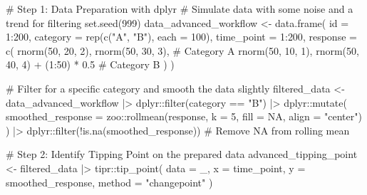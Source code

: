 \documentclass[
  10pt,
  letterpaper,
  DIV=11,
  numbers=noendperiod]{scrartcl}
\newenvironment{Shaded}{\begin{snugshade}}{\end{snugshade}}
\newcommand{\AttributeTok}[1]{\textcolor[rgb]{0.40,0.45,0.13}{#1}}
\newcommand{\CommentTok}[1]{\textcolor[rgb]{0.37,0.37,0.37}{#1}}
\newcommand{\ConstantTok}[1]{\textcolor[rgb]{0.56,0.35,0.01}{#1}}
\newcommand{\DecValTok}[1]{\textcolor[rgb]{0.68,0.00,0.00}{#1}}
\newcommand{\FloatTok}[1]{\textcolor[rgb]{0.68,0.00,0.00}{#1}}
\newcommand{\FunctionTok}[1]{\textcolor[rgb]{0.28,0.35,0.67}{#1}}
\newcommand{\NormalTok}[1]{\textcolor[rgb]{0.00,0.23,0.31}{#1}}
\newcommand{\OtherTok}[1]{\textcolor[rgb]{0.00,0.23,0.31}{#1}}
\newcommand{\SpecialCharTok}[1]{\textcolor[rgb]{0.37,0.37,0.37}{#1}}
\newcommand{\StringTok}[1]{\textcolor[rgb]{0.13,0.47,0.30}{#1}}
\begin{document}
\begin{Shaded}
\begin{Highlighting}[]
\CommentTok{\# Step 1: Data Preparation with dplyr}
\CommentTok{\# Simulate data with some noise and a trend for filtering}
\FunctionTok{set.seed}\NormalTok{(}\DecValTok{999}\NormalTok{)}
\NormalTok{data\_advanced\_workflow }\OtherTok{\textless{}{-}} \FunctionTok{data.frame}\NormalTok{(}
  \AttributeTok{id =} \DecValTok{1}\SpecialCharTok{:}\DecValTok{200}\NormalTok{,}
  \AttributeTok{category =} \FunctionTok{rep}\NormalTok{(}\FunctionTok{c}\NormalTok{(}\StringTok{"A"}\NormalTok{, }\StringTok{"B"}\NormalTok{), }\AttributeTok{each =} \DecValTok{100}\NormalTok{),}
  \AttributeTok{time\_point =} \DecValTok{1}\SpecialCharTok{:}\DecValTok{200}\NormalTok{,}
  \AttributeTok{response =} \FunctionTok{c}\NormalTok{(}
    \FunctionTok{rnorm}\NormalTok{(}\DecValTok{50}\NormalTok{, }\DecValTok{20}\NormalTok{, }\DecValTok{2}\NormalTok{), }\FunctionTok{rnorm}\NormalTok{(}\DecValTok{50}\NormalTok{, }\DecValTok{30}\NormalTok{, }\DecValTok{3}\NormalTok{), }\CommentTok{\# Category A}
    \FunctionTok{rnorm}\NormalTok{(}\DecValTok{50}\NormalTok{, }\DecValTok{10}\NormalTok{, }\DecValTok{1}\NormalTok{), }\FunctionTok{rnorm}\NormalTok{(}\DecValTok{50}\NormalTok{, }\DecValTok{40}\NormalTok{, }\DecValTok{4}\NormalTok{) }\SpecialCharTok{+}\NormalTok{ (}\DecValTok{1}\SpecialCharTok{:}\DecValTok{50}\NormalTok{) }\SpecialCharTok{*} \FloatTok{0.5} \CommentTok{\# Category B}
\NormalTok{  )}
\NormalTok{)}

\CommentTok{\# Filter for a specific category and smooth the data slightly}
\NormalTok{filtered\_data }\OtherTok{\textless{}{-}}\NormalTok{ data\_advanced\_workflow }\SpecialCharTok{|\textgreater{}}
\NormalTok{  dplyr}\SpecialCharTok{::}\FunctionTok{filter}\NormalTok{(category }\SpecialCharTok{==} \StringTok{"B"}\NormalTok{) }\SpecialCharTok{|\textgreater{}}
\NormalTok{  dplyr}\SpecialCharTok{::}\FunctionTok{mutate}\NormalTok{(}
    \AttributeTok{smoothed\_response =}\NormalTok{ zoo}\SpecialCharTok{::}\FunctionTok{rollmean}\NormalTok{(response, }\AttributeTok{k =} \DecValTok{5}\NormalTok{, }\AttributeTok{fill =} \ConstantTok{NA}\NormalTok{, }\AttributeTok{align =} \StringTok{"center"}\NormalTok{)}
\NormalTok{  ) }\SpecialCharTok{|\textgreater{}}
\NormalTok{  dplyr}\SpecialCharTok{::}\FunctionTok{filter}\NormalTok{(}\SpecialCharTok{!}\FunctionTok{is.na}\NormalTok{(smoothed\_response)) }\CommentTok{\# Remove NA from rolling mean}

\CommentTok{\# Step 2: Identify Tipping Point on the prepared data}
\NormalTok{advanced\_tipping\_point }\OtherTok{\textless{}{-}}\NormalTok{ filtered\_data }\SpecialCharTok{|\textgreater{}}
\NormalTok{  tipr}\SpecialCharTok{::}\FunctionTok{tip\_point}\NormalTok{(}
    \AttributeTok{data =}\NormalTok{ \_,}
    \AttributeTok{x =}\NormalTok{ time\_point,}
    \AttributeTok{y =}\NormalTok{ smoothed\_response,}
    \AttributeTok{method =} \StringTok{"changepoint"}
\NormalTok{  )}


\end{Highlighting}
\end{Shaded}
\end{document}
